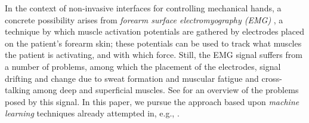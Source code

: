 In the context of non-invasive interfaces for controlling
mechanical hands, a concrete possibility arises from \emph{forearm
surface electromyography (EMG)} \cite{zecca}, a technique by which
muscle activation potentials are gathered by electrodes placed on
the patient's forearm skin; these potentials can be used to track
what muscles the patient is activating, and with which force.
Still, the EMG signal suffers from a number of problems, among
which the placement of the electrodes, signal drifting and change
due to sweat formation and muscular fatigue and cross-talking
among deep and superficial muscles. See \cite{deluca} for an
overview of the problems posed by this signal. In this paper, we
pursue the approach based upon \emph{machine learning} techniques
already attempted in, e.g., \cite{dunlop,fukuda,smagt}.


